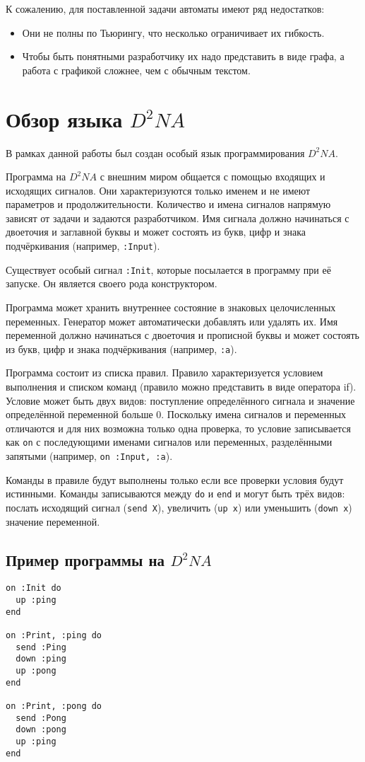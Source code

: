 \documentclass[a4paper,14pt]{extarticle}
\begin{document}
К сожалению, для поставленной задачи автоматы имеют ряд недостатков:
\begin{itemize}
  \item Они не полны по Тьюрингу, что несколько ограничивает их гибкость.
  \item Чтобы быть понятными разработчику их надо представить в виде графа, а
        работа с графикой сложнее, чем с обычным текстом.
\end{itemize}

\section{Обзор языка $D^2NA$}
В рамках данной работы был создан особый язык программирования $D^2NA$.

Программа на $D^2NA$ с внешним миром общается с помощью входящих и исходящих
сигналов. Они характеризуются только именем и не имеют параметров и
продолжительности. Количество и имена сигналов напрямую зависят от задачи и
задаются разработчиком. Имя сигнала должно начинаться с двоеточия и заглавной
буквы и может состоять из букв, цифр и знака подчёркивания (например,
\texttt{:Input}).

Существует особый сигнал \texttt{:Init}, которые посылается в программу при её
запуске. Он является своего рода конструктором.

Программа может хранить внутреннее состояние в знаковых целочисленных
переменных. Генератор может автоматически добавлять или удалять их. Имя
переменной должно начинаться с двоеточия и прописной буквы и может состоять из
букв, цифр и знака подчёркивания (например, \texttt{:a}).

Программа состоит из списка правил. Правило характеризуется условием выполнения
и списком команд (правило можно представить в виде оператора if). Условие может
быть двух видов: поступление определённого сигнала и значение определённой
переменной больше 0. Поскольку имена сигналов и переменных отличаются и для
них возможна только одна проверка, то условие записывается как \texttt{on} с
последующими именами сигналов или переменных, разделёнными запятыми (например,
\texttt{on~:Input, :a}).

Команды в правиле будут выполнены только если все проверки условия будут
истинными. Команды записываются между \texttt{do} и \texttt{end} и могут быть
трёх видов: послать исходящий сигнал (\texttt{send X}), увеличить
(\texttt{up x}) или уменьшить (\texttt{down x}) значение переменной.

\subsection{Пример программы на $D^2NA$}
\begin{verbatim}
on :Init do
  up :ping
end

on :Print, :ping do
  send :Ping
  down :ping
  up :pong
end

on :Print, :pong do
  send :Pong
  down :pong
  up :ping
end
\end{verbatim}
\end{document}
